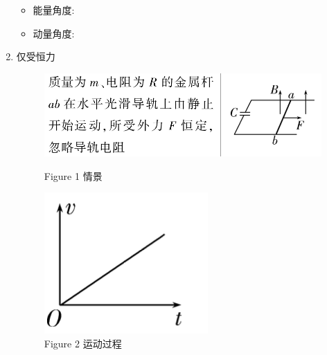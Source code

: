 \documentclass{article}
\begin{document}
\begin{enumerate}[label = (\arabic*{})]
          \newpage

          \begin{itemize}
              \item 能量角度:
                    \vspace{5em}
              \item 动量角度:
                    \vspace{5em}
          \end{itemize}

          \vspace{2em}

    \item 仅受恒力

          \begin{figure}[H]
              \begin{minipage}{0.7\textwidth}
                  \centering
                  \includegraphics[width = \textwidth]{pictures/13.png}
                  \caption*{Figure 1 情景}
              \end{minipage}
              \hfill
              \begin{minipage}{0.25\textwidth}
                  \centering
                  \includegraphics[width = \textwidth]{pictures/14.png}
                  \caption*{Figure 2 运动过程}
              \end{minipage}
          \end{figure}


\end{enumerate}
\end{document}
